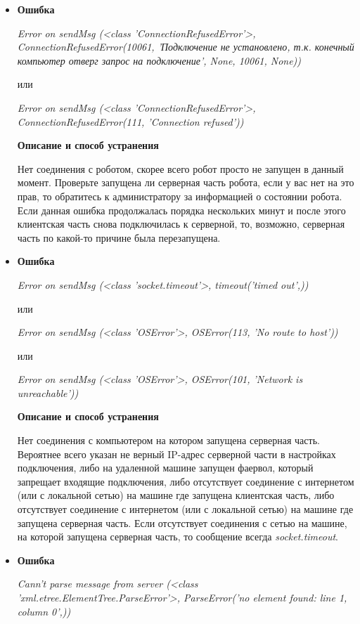 \begin{itemize}
\item \textbf{Ошибка}

\textit{Error on sendMsg (<class 'ConnectionRefusedError'>, ConnectionRefusedError(10061, 'Подключение не установлено, т.к. конечный компьютер отверг запрос на подключение',
None, 10061, None))}

или 

\textit{Error on sendMsg (<class 'ConnectionRefusedError'>, ConnectionRefusedError(111, 'Connection refused'))}

\textbf{Описание и способ устранения}

Нет соединения с роботом, скорее всего робот просто не запущен в данный момент. Проверьте запущена ли серверная часть робота, если у вас нет на это прав, то обратитесь к
администратору за информацией о состоянии робота. Если данная ошибка продолжалась порядка нескольких минут и после этого клиентская часть снова подключилась к серверной, то,
возможно, серверная часть по какой-то причине была перезапущена.

\item \textbf{Ошибка}

\textit{Error on sendMsg (<class 'socket.timeout'>, timeout('timed out',))}

или 

\textit{Error on sendMsg (<class 'OSError'>, OSError(113, 'No route to host'))}

или

\textit{Error on sendMsg (<class 'OSError'>, OSError(101, 'Network is unreachable'))}

\textbf{Описание и способ устранения}

Нет соединения с компьютером на котором запущена серверная часть. Вероятнее всего указан не верный IP-адрес серверной части в настройках подключения, либо на удаленной машине
запущен фаервол, который запрещает входящие подключения, либо отсутствует соединение с интернетом (или с локальной сетью) на машине где запущена клиентская часть, либо
отсутствует соединение с интернетом (или с локальной сетью) на машине где запущена серверная часть. Если отсутствует соединения с сетью на машине, на которой запущена
серверная часть, то сообщение всегда \textit{socket.timeout}.

\item \textbf{Ошибка}

\textit{Cann't parse message from server  (<class 'xml.etree.ElementTree.ParseError'>, ParseError('no element found: line 1, column 0',))}


\end{itemize}
